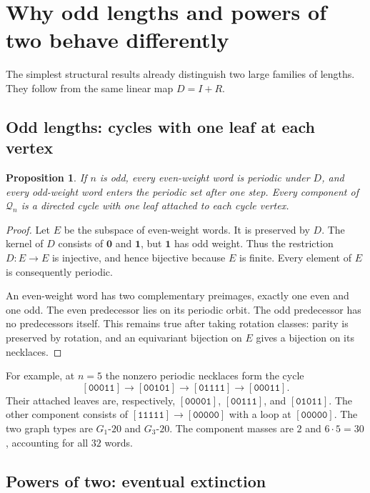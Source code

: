 \documentclass[11pt]{article}
\newtheorem{proposition}{Proposition}[section]
\theoremstyle{definition}
\newcommand{\one}{\mathbf 1}
\newcommand{\zero}{\mathbf 0}
\newcommand{\neck}[1]{[\mathtt{#1}]}
\numberwithin{equation}{section}
\begin{document}
\section{Why odd lengths and powers of two behave differently}\label{sec:lengths}

The simplest structural results already distinguish two large families
of lengths. They follow from the same linear map $D=I+R$.

\subsection{Odd lengths: cycles with one leaf at each vertex}

\begin{proposition}\label{prop:odd}
If $n$ is odd, every even-weight word is periodic under $D$, and every
odd-weight word enters the periodic set after one step. Every component
of $\mathcal Q_n$ is a directed cycle with one leaf attached to each
cycle vertex.
\end{proposition}
\begin{proof}
Let $E$ be the subspace of even-weight words. It is preserved by $D$.
The kernel of $D$ consists of $\zero$ and $\one$, but $\one$ has odd
weight. Thus the restriction $D:E\to E$ is injective, and hence
bijective because $E$ is finite. Every element of $E$ is consequently
periodic.

An even-weight word has two complementary preimages, exactly one even
and one odd. The even predecessor lies on its periodic orbit. The odd
predecessor has no predecessors itself. This remains true after taking
rotation classes: parity is preserved by rotation, and an equivariant
bijection on $E$ gives a bijection on its necklaces.
\end{proof}

For example, at $n=5$ the nonzero periodic necklaces form the cycle
\begin{equation}\label{eq:five-cycle}
 \neck{00011}\longrightarrow\neck{00101}
 \longrightarrow\neck{01111}\longrightarrow\neck{00011}.
\end{equation}
Their attached leaves are, respectively, $\neck{00001}$,
$\neck{00111}$, and $\neck{01011}$. The other component consists of
$\neck{11111}\to\neck{00000}$ with a loop at $\neck{00000}$.
The two graph types are $G_1\text{-}20$ and $G_3\text{-}20$.
The component masses are $2$ and $6\cdot5=30$, accounting for all
$32$ words.

\subsection{Powers of two: eventual extinction}
\end{document}

